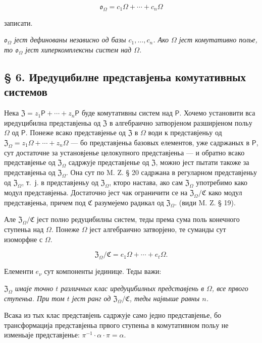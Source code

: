 \documentclass[11pt]{article}
\begin{document}
\[
\mathfrak{o}_{\Omega}=c_1\Omega+\cdots+c_n\Omega
\]

записати.

\emph{\(\mathfrak{o}_{\Omega}\) јест дефинованы независно од базы \(c_1,\ldots,c_n\). Ако \(\Omega\) јест комутативно полье, то \(\mathfrak{o}_{\Omega}\) јест хиперкомплексны систем над \(\Omega\).}

\subsection*{§ 6. Иредуцибилне представјеньа комутативных системов}\label{die-irreduziblen-darstellungen-kommutativer-systeme}

Нека \(\mathfrak Z=z_1\mathsf P+\cdots+z_n\mathsf P\) буде комутативны систем над \(\mathsf P\). Хочемо установити вса иредуцибилна представјеньа од \(\mathfrak Z\) в алгебраично затворјеном разширјеном польу \(\Omega\) од \(\mathsf P\). Понеже всако представјенье од \(\mathfrak Z\) в \(\Omega\) води к представјеньу од \(\mathfrak Z_\Omega=z_1\Omega+\cdots+z_n\Omega\) --- бо представјеньа базовых елементов, уже садржаных в \(\mathsf P\), сут достаточне за установјенье целокупного представјеньа --- и обратно всако представјенье од \(\mathfrak Z_\Omega\) садржује представјенье од \(\mathfrak Z\), можно јест пытати такоже за представјеньа од \(\mathfrak Z_\Omega\). Она сут по M. Z. § 20 садржана в регуларном представјеньу од \(\mathfrak Z_\Omega\), т.~ј. в представјеньу од \(\mathfrak Z_\Omega\), кторо настава, ако сам \(\mathfrak Z_\Omega\) употребимо како модул представјеньа. Достаточно јест чак ограничити се на \(\mathfrak Z_\Omega/\mathfrak C\) како модул представјеньа, причем под \(\mathfrak C\) разумејемо радикал од \(\mathfrak Z_\Omega\). (види M. Z. § 19).

Але \(\mathfrak Z_\Omega/\mathfrak C\) јест полно редуцибилны систем, теды према сума поль конечного ступеньа над \(\Omega\). Понеже \(\Omega\) јест алгебраично затворјено, те суманды сут изоморфне с \(\Omega\).

\[
\mathfrak Z_\Omega/\mathfrak C=e_1\Omega+\cdots+e_t\Omega.
\]

Елементи \(e_\nu\) сут компоненты јединице. Теды важи:

\emph{\(\mathfrak Z_\Omega\) имаје точно \(t\) различных клас иредуцибилных представјень в \(\Omega\), все првого ступеньа. При том \(t\) јест ранг од \(\mathfrak Z_\Omega/\mathfrak C\), теды највыше равны \(n\).}

Всака из тых клас представјень садржује само једно представјенье, бо трансформација представјеньа првого ступеньа в комутативном польу не изменьаје представјенье: \(\pi^{-1}\cdot\alpha\cdot\pi=\alpha\).
\end{document}
